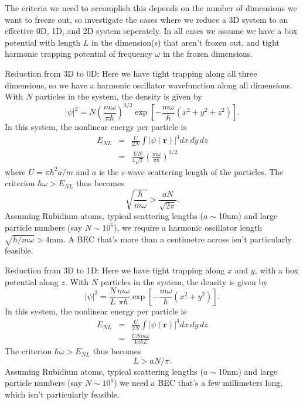 \documentclass[12pt]{iopart}
\begin{document}
The criteria we need to accomplish this depends on the number of dimensions we want to freeze out, so investigate the cases where we reduce a 3D system to an effective 0D, 1D, and 2D system seperately. In all cases we assume we have a box potential with length $L$ in the dimension(s) that aren't frozen out, and tight harmonic trapping potential of frequency $\omega$ in the frozen dimensions.

Reduction from 3D to 0D: Here we have tight trapping along all three dimensions, so we have a harmonic oscillator wavefunction along all dimensions. With $N$ particles in the system, the density is given by
\begin{equation}
|\psi|^2 = N \left( \frac{m \omega}{\pi \hbar} \right)^{3/2} \exp \left[ -\frac{m \omega} {\hbar} (x^2 +y^2+z^2) \right] .
\end{equation}
In this system, the nonlinear energy per particle is
\begin{eqnarray}
E_{NL} &=& \frac{U}{2N} \int |\psi({\mathbf{r}})|^4 dx \, dy \, dz \\
       &=& \frac{U N}{4 \sqrt{2}} \left( \frac{m \omega}{\pi \hbar} \right)^{3/2}
\end{eqnarray}
where $U = \pi \hbar^2 a/m$ and $a$ is the s-wave scattering length of the particles. The criterion $\hbar \omega > E_{NL}$ thus becomes
\begin{equation}
\sqrt{\frac{\hbar}{m \omega}} > \frac{aN}{\sqrt{2 \pi}}.
\end{equation}
Assuming Rubidium atoms, typical scattering lengths ($a\sim$10nm) and large particle numbers (say $N\sim 10^6$), we require a harmonic oscillator length $\sqrt{\hbar/ m \omega}>4$mm.  A BEC that's more than a centimetre across isn't particularly feasible.

Reduction from 3D to 1D: Here we have tight trapping along $x$ and $y$, with a box potential along $z$. With $N$ particles in the system, the density is given by
\begin{equation}
|\psi|^2 = \frac{N}{L} \frac{m \omega}{\pi \hbar} \exp \left[ -\frac{m \omega} {\hbar}  (x^2 +y^2) \right] .
\end{equation}
In this system, the nonlinear energy per particle is
\begin{eqnarray}
E_{NL} &=& \frac{U}{2N} \int |\psi({\mathbf{r}})|^4 dx \, dy \, dz \\
       &=& \frac{U N m \omega}{4 \pi \hbar L}
\end{eqnarray}
The criterion $\hbar \omega > E_{NL}$ thus becomes
\begin{equation}
L > a N / \pi.
\end{equation}
Assuming Rubidium atoms, typical scattering lengths ($a\sim$10nm) and large particle numbers (say $N\sim 10^6$) we need a BEC that's a few millimeters long, which isn't particularly feasible.
\end{document}
